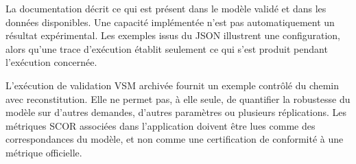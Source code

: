 La documentation décrit ce qui est présent dans le modèle validé et dans les données disponibles. Une capacité implémentée n'est pas automatiquement un résultat expérimental. Les exemples issus du JSON illustrent une configuration, alors qu'une trace d'exécution établit seulement ce qui s'est produit pendant l'exécution concernée.

L'exécution de validation VSM archivée fournit un exemple contrôlé du chemin avec reconstitution. Elle ne permet pas, à elle seule, de quantifier la robustesse du modèle sur d'autres demandes, d'autres paramètres ou plusieurs réplications. Les métriques SCOR associées dans l'application doivent être lues comme des correspondances du modèle, et non comme une certification de conformité à une métrique officielle.

